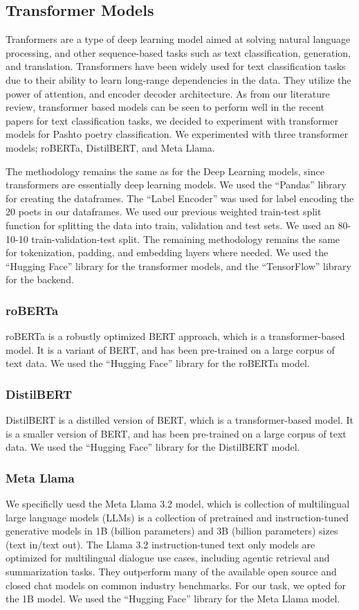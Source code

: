 \subsection{Transformer Models}

Tranformers are a type of deep learning model aimed at solving natural language processing, and other sequence-based tasks such as text classification, generation, and translation. Transformers have been widely used for text classification tasks due to their ability to learn long-range dependencies in the data. They utilize the power of attention, and encoder decoder architecture. As from our literature review, transformer based models can be seen to perform well in the recent papers for text classification tasks, we decided to experiment with transformer models for Pashto poetry classification. We experimented with three transformer models; roBERTa, DistilBERT, and Meta Llama. 

The methodology remains the same as for the Deep Learning models, since transformers are essentially deep learning models. We used the ``Pandas'' library for creating the dataframes. The ``Label Encoder'' was used for label encoding the 20 poets in our dataframes. We used our previous weighted train-test split function for splitting the data into train, validation and test sets. We used an 80-10-10 train-validation-test split. The remaining methodology remains the same for tokenization, padding, and embedding layers where needed. We used the ``Hugging Face'' library for the transformer models, and the ``TensorFlow'' library for the backend. 


\subsubsection{roBERTa}
roBERTa is a robustly optimized BERT approach, which is a transformer-based model. It is a variant of BERT, and has been pre-trained on a large corpus of text data. We used the ``Hugging Face'' library for the roBERTa model.


\subsubsection{DistilBERT}
DistilBERT is a distilled version of BERT, which is a transformer-based model. It is a smaller version of BERT, and has been pre-trained on a large corpus of text data. We used the ``Hugging Face'' library for the DistilBERT model. 


\subsubsection{Meta Llama}
We specificlly uesd the Meta Llama 3.2 model, which is collection of multilingual large language models (LLMs) is a collection of pretrained and instruction-tuned generative models in 1B (billion parameters) and 3B (billion parameters) sizes (text in/text out). The Llama 3.2 instruction-tuned text only models are optimized for multilingual dialogue use cases, including agentic retrieval and summarization tasks. They outperform many of the available open source and closed chat models on common industry benchmarks. For our task, we opted for the 1B model. We used the ``Hugging Face'' library for the Meta Llama model. 